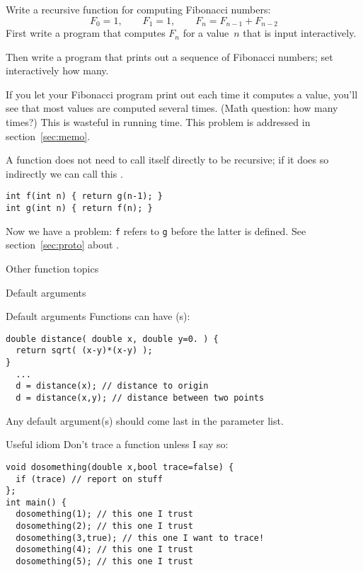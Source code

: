 \begin{exercise}
  \label{ex:recur-fib}
  Write a recursive function for computing Fibonacci numbers:
  \[ F_0=1,\qquad F_1=1,\qquad F_{n}=F_{n-1}+F_{n-2} \]
  First write a program that computes $F_n$ for a value~$n$ that is
  input interactively.

  Then write a program that prints out a sequence of Fibonacci
  numbers; set interactively how many.
\end{exercise}

\begin{remark}
  If you let your Fibonacci program print out each time it computes a
  value, you'll see that most values are computed several times. (Math
  question: how many times?) This is wasteful in running time. This
  problem is addressed in section~\ref{sec:memo}.
\end{remark}

\begin{remark}
  A function does not need to call itself directly to be recursive; if
  it does so indirectly we can call this .
\begin{lstlisting}
int f(int n) { return g(n-1); }
int g(int n) { return f(n); }
\end{lstlisting}
Now we have a problem: \lstinline{f} refers to \lstinline{g}
before the latter is defined.
See section~\ref{sec:proto}
about .
\end{remark}

 {Other function topics}

 {Default arguments}

\begin{block}{Default arguments}
  \label{sl:def-arg}
  Functions can have (s):
\begin{lstlisting}
double distance( double x, double y=0. ) {
  return sqrt( (x-y)*(x-y) );
}
  ...
  d = distance(x); // distance to origin
  d = distance(x,y); // distance between two points
\end{lstlisting}
Any default argument(s) should come last in the parameter list.
\end{block}

\begin{block}{Useful idiom}
  \label{sl:poly-trace}
  Don't trace a function unless I say so:
\begin{lstlisting}
void dosomething(double x,bool trace=false) {
  if (trace) // report on stuff
};
int main() {
  dosomething(1); // this one I trust
  dosomething(2); // this one I trust
  dosomething(3,true); // this one I want to trace!
  dosomething(4); // this one I trust
  dosomething(5); // this one I trust
\end{lstlisting}
\end{block}

